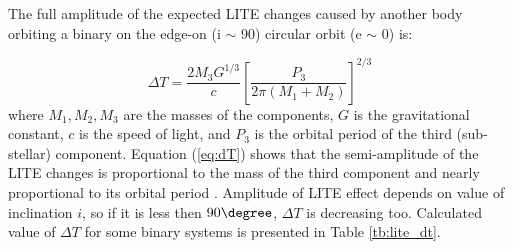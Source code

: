 \begin{table}[!t]
 \centering
 \caption{Expected LITE amplitude for Jupiter-mass companion on 15-years orbit and theoretical precision for 60 cm telescope \citep{Pribula2012}.}
 \label{tb:lite_dt}
 \vspace*{1ex}
\end{table}

The full amplitude of the expected LITE changes caused by another body orbiting a binary on the edge-on (i $\sim$ 90\degree ) circular orbit (e $\sim$ 0\degree) is:

\begin{equation}\label{eq:dT}
\Delta T = \dfrac{2M_{3}G^{1/3}}{c} \left[    \dfrac{P_{3}}{ 2 \pi \left( M_{1}+M_{2} \right) }   \right]^{2/3} 
\end{equation}
where $M_{1} , M_{2} , M_{3}$ are the masses of the components, $G$ is the gravitational constant, $c$ is the speed of light, 
and $P_{3}$ is the orbital period of the third (sub-stellar) component. Equation (\ref{eq:dT}) shows that the semi-amplitude of the LITE
changes is proportional to the mass of the third component and nearly proportional to its orbital period \citep{Pribula2012}. 
Amplitude of LITE effect depends on value of inclination $i$, so if it is less then $90\degree$, $\Delta T$ is decreasing too.   
Calculated value of $\Delta T$ for some binary systems is presented in Table \ref{tb:lite_dt}. 

